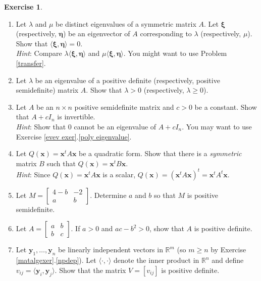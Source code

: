 \documentclass[12pt,letterpaper]{book}
\numberwithin{equation}{section}
\theoremstyle{definition}
\newtheorem{exercise}{\textbf{Exercise}}[chapter]
\newcommand{\vx}{\bm{x}}
\newcommand{\vxi}{\bm{\xi}}
\newcommand{\veta}{\bm{\eta}}
\begin{document}
\begin{exercise}\label{singular exercises}\quad
\begin{enumerate}[\bfseries 1.]
\item Let $\lambda$ and $\mu$ be distinct eigenvalues of a symmetric matrix $A$. Let $\vxi$ (respectively, $\veta$) be an eigenvector of $A$ corresponding to $\lambda$ (respectively, $\mu$). Show that $\langle \vxi,\veta \rangle=0$.\\
\textit{Hint}: Compare $\lambda\langle \vxi,\veta\rangle$ and  $\mu\langle \vxi,\veta\rangle$. You might want to use Problem \ref{transfer}.

\item\label{definite eigen} Let $\lambda$ be an eigenvalue of a positive definite (respectively, positive semidefinite) matrix $A$. Show that $\lambda > 0$ (respectively, $\lambda \geq 0$).

\item Let $A$ be an $n\times n$ positive semidefinite matrix and $c>0$ be a constant. Show that $A+cI_n$ is invertible. \\\textit{Hint}: Show that $0$ cannot be an eigenvalue of $A+cI_n$. You may want to use Exercise \ref{evev exer}.\ref{poly eigenvalue}.

\item\label{symmqf} Let $Q(\vx)=\vx^t A \vx$ be a quadratic form. Show that there is a \textit{symmetric} matrix $B$ such that $Q(\vx)=\vx^t B \vx$.\\\textit{Hint}: Since $Q(\vx)=\vx^t A \vx$ is a scalar, $Q(\vx)=(\vx^t A \vx)^t=\vx^t A^t \vx$.

\item Let $M=\left[\begin{array}{cr} 4-b & -2 \\ a & b \end{array}\right]$. Determine $a$ and $b$ so that $M$ is positive semidefinite.

\item\label{2by2posdefdet} Let $A=\left[\begin{array}{cc} a & b \\ b & c \end{array}\right]$. If $a>0$ and $ac-b^2>0$, show that $A$ is positive definite.

\item\label{gram equiv} Let $\bm{y}_1,\ldots,\bm{y}_n$ be linearly independent vectors in $\mathbb{R}^m$ (so $m\geq n$ by Exercise \ref{matalgexer}.\ref{npdep}). Let $\langle \cdot, \cdot \rangle$ denote the inner product in $\mathbb{R}^n$ and define $v_{ij}=\langle \bm{y}_i, \bm{y}_{j} \rangle$. Show that the matrix $V=[v_{ij}]$ is positive definite.


\end{enumerate}
\end{exercise}
\end{document}
